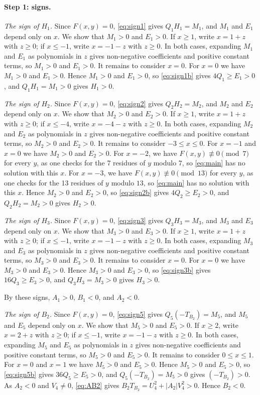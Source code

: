 \documentclass[11pt]{article}
\begin{document}
\paragraph{Step 1: signs.} \emph{The sign of $H_{1}$.} Since $F(x,y)=0$, \eqref{eq:sign1} gives $Q_{1}H_{1}=M_{1}$, and $M_{1}$ and $E_{1}$ depend only on $x$. We show that $M_{1}>0$ and $E_{1}>0$. If $x\geq1$, write $x=1+z$ with $z\geq0$; if $x\leq-1$, write $x=-1-z$ with $z\geq0$. In both cases, expanding $M_{1}$ and $E_{1}$ as polynomials in $z$ gives non-negative coefficients and positive constant terms, so $M_{1}>0$ and $E_{1}>0$. It remains to consider $x=0$. For $x=0$ we have $M_{1}>0$ and $E_{1}>0$. Hence $M_{1}>0$ and $E_{1}>0$, so \eqref{eq:sign1b} gives $4Q_{1}\geq E_{1}>0$, and $Q_{1}H_{1}=M_{1}>0$ gives $H_{1}>0$.

\emph{The sign of $H_{2}$.} Since $F(x,y)=0$, \eqref{eq:sign2} gives $Q_{2}H_{2}=M_{2}$, and $M_{2}$ and $E_{2}$ depend only on $x$. We show that $M_{2}>0$ and $E_{2}>0$. If $x\geq1$, write $x=1+z$ with $z\geq0$; if $x\leq-4$, write $x=-4-z$ with $z\geq0$. In both cases, expanding $M_{2}$ and $E_{2}$ as polynomials in $z$ gives non-negative coefficients and positive constant terms, so $M_{2}>0$ and $E_{2}>0$. It remains to consider $-3\leq x\leq0$. For $x=-1$ and $x=0$ we have $M_{2}>0$ and $E_{2}>0$. For $x=-2$, we have $F(x,y)\not\equiv0\pmod{7}$ for every $y$, as one checks for the 7 residues of $y$ modulo $7$, so \eqref{eq:main} has no solution with this $x$. For $x=-3$, we have $F(x,y)\not\equiv0\pmod{13}$ for every $y$, as one checks for the 13 residues of $y$ modulo $13$, so \eqref{eq:main} has no solution with this $x$. Hence $M_{2}>0$ and $E_{2}>0$, so \eqref{eq:sign2b} gives $4Q_{2}\geq E_{2}>0$, and $Q_{2}H_{2}=M_{2}>0$ gives $H_{2}>0$.

\emph{The sign of $H_{3}$.} Since $F(x,y)=0$, \eqref{eq:sign3} gives $Q_{3}H_{3}=M_{3}$, and $M_{3}$ and $E_{3}$ depend only on $x$. We show that $M_{3}>0$ and $E_{3}>0$. If $x\geq1$, write $x=1+z$ with $z\geq0$; if $x\leq-1$, write $x=-1-z$ with $z\geq0$. In both cases, expanding $M_{3}$ and $E_{3}$ as polynomials in $z$ gives non-negative coefficients and positive constant terms, so $M_{3}>0$ and $E_{3}>0$. It remains to consider $x=0$. For $x=0$ we have $M_{3}>0$ and $E_{3}>0$. Hence $M_{3}>0$ and $E_{3}>0$, so \eqref{eq:sign3b} gives $16Q_{3}\geq E_{3}>0$, and $Q_{3}H_{3}=M_{3}>0$ gives $H_{3}>0$.

By these signs, $A_{1}>0$, $B_{1}<0$, and $A_{2}<0$.

\emph{The sign of $B_{2}$.} Since $F(x,y)=0$, \eqref{eq:sign5} gives $Q_{5}(-T_{B_{2}})=M_{5}$, and $M_{5}$ and $E_{5}$ depend only on $x$. We show that $M_{5}>0$ and $E_{5}>0$. If $x\geq2$, write $x=2+z$ with $z\geq0$; if $x\leq-1$, write $x=-1-z$ with $z\geq0$. In both cases, expanding $M_{5}$ and $E_{5}$ as polynomials in $z$ gives non-negative coefficients and positive constant terms, so $M_{5}>0$ and $E_{5}>0$. It remains to consider $0\leq x\leq1$. For $x=0$ and $x=1$ we have $M_{5}>0$ and $E_{5}>0$. Hence $M_{5}>0$ and $E_{5}>0$, so \eqref{eq:sign5b} gives $36Q_{5}\geq E_{5}>0$, and $Q_{5}(-T_{B_{2}})=M_{5}>0$ gives $(-T_{B_{2}})>0$. As $A_{2}<0$ and $V_{4}\neq0$, \eqref{eq:AB2} gives $B_{2}T_{B_{2}}=U_{4}^2+|A_{2}|V_{4}^2>0$. Hence $B_{2}<0$.
\end{document}
